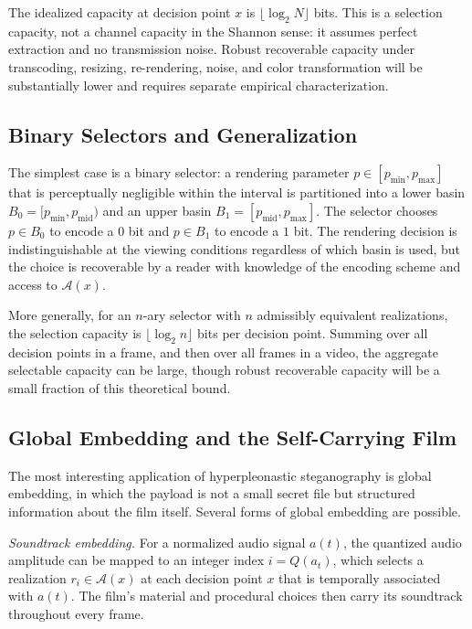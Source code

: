 \documentclass[12pt,a4paper]{article}
\theoremstyle{plain}
\theoremstyle{definition}
\theoremstyle{remark}
\begin{document}
The idealized capacity at decision point $x$ is $\lfloor \log_2 N \rfloor$ bits. This is a selection capacity, not a channel capacity in the Shannon sense: it assumes perfect extraction and no transmission noise. Robust recoverable capacity under transcoding, resizing, re-rendering, noise, and color transformation will be substantially lower and requires separate empirical characterization.

\subsection{Binary Selectors and Generalization}

The simplest case is a binary selector: a rendering parameter $p \in [p_{\min}, p_{\max}]$ that is perceptually negligible within the interval is partitioned into a lower basin $B_0 = [p_{\min}, p_{\mathrm{mid}})$ and an upper basin $B_1 = [p_{\mathrm{mid}}, p_{\max}]$. The selector chooses $p \in B_0$ to encode a $0$ bit and $p \in B_1$ to encode a $1$ bit. The rendering decision is indistinguishable at the viewing conditions regardless of which basin is used, but the choice is recoverable by a reader with knowledge of the encoding scheme and access to $\mathcal{A}(x)$.

More generally, for an $n$-ary selector with $n$ admissibly equivalent realizations, the selection capacity is $\lfloor \log_2 n \rfloor$ bits per decision point. Summing over all decision points in a frame, and then over all frames in a video, the aggregate selectable capacity can be large, though robust recoverable capacity will be a small fraction of this theoretical bound.

\subsection{Global Embedding and the Self-Carrying Film}

The most interesting application of hyperpleonastic steganography is global embedding, in which the payload is not a small secret file but structured information about the film itself. Several forms of global embedding are possible.

\textit{Soundtrack embedding.} For a normalized audio signal $a(t)$, the quantized audio amplitude can be mapped to an integer index $i = Q(a_t)$, which selects a realization $r_i \in \mathcal{A}(x)$ at each decision point $x$ that is temporally associated with $a(t)$. The film's material and procedural choices then carry its soundtrack throughout every frame.
\end{document}
